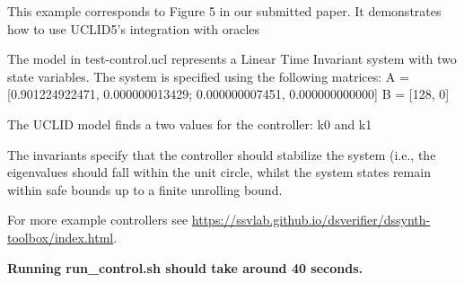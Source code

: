 This example corresponds to Figure 5 in our submitted paper. It demonstrates how to use
UCLID5's integration with oracles

The model in test-control.ucl represents a Linear Time Invariant system with two state variables. The system is specified using the following matrices:
A = [0.901224922471, 0.000000013429; 0.000000007451, 0.000000000000]
B = [128, 0]

The UCLID model finds a two values for the controller: k0 and k1

The invariants specify that the controller should stabilize the system (i.e., the eigenvalues should fall within the unit circle, whilst the system states remain within safe bounds up to a finite unrolling bound. 

For more example controllers see \url{https://ssvlab.github.io/dsverifier/dssynth-toolbox/index.html}. 


\textbf{Running
run\_control.sh should take around 40 seconds.}